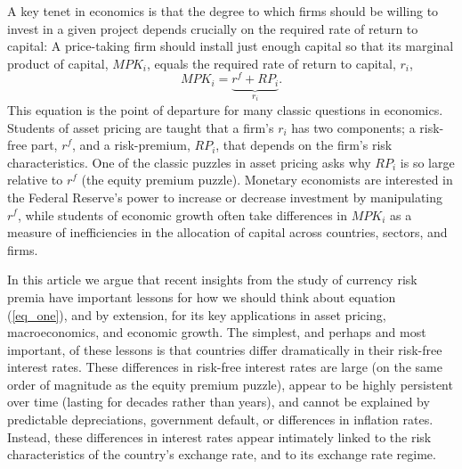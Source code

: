 \documentclass{ar-1col}
\begin{document}
A key tenet in economics is that the degree to which firms should be willing to invest in a given project depends crucially on the required rate of return to capital: A price-taking firm should install just enough capital so that its marginal product of capital, $MPK_i$, equals the required rate of return to capital, $r_i$,
\begin{equation}
  MPK_i=\underbrace{r^f+RP_i}_{r_i}.
  \label{eq_one}
\end{equation} 
This equation is the point of departure for many classic questions in economics. Students of asset pricing are taught that a firm's $r_i$ has two components; a risk-free part, $r^f$, and a risk-premium, $RP_i$, that depends on the firm's risk characteristics. One of the classic puzzles in asset pricing asks why $RP_i$ is so large relative to $r^f$ (the equity premium puzzle). Monetary economists are interested in the Federal Reserve's power to increase or decrease investment by manipulating $r^f$, while students of economic growth often take differences in $MPK_i$ as a measure of inefficiencies in the allocation of capital across countries, sectors, and firms.

In this article we argue that recent insights from the study of currency risk premia have important lessons for how we should think about equation (\eqref{eq_one}), and by extension, for its key applications in asset pricing, macroeconomics, and economic growth. The simplest, and perhaps and most important, of these lessons is that countries differ dramatically in their risk-free interest rates. These differences in risk-free interest rates are large (on the same order of magnitude as the equity premium puzzle), appear to be highly persistent over time (lasting for decades rather than years), and cannot be explained by predictable depreciations, government default, or differences in inflation rates. Instead, these differences in interest rates appear intimately linked to the risk characteristics of the country's exchange rate, and to its exchange rate regime.
\end{document}
